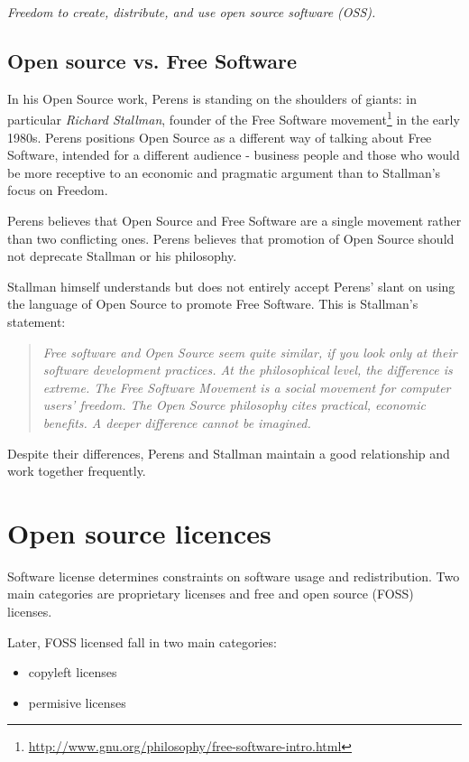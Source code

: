 \documentclass[times, utf8, seminar]{fit}
\begin{document}
\begin{center}
\emph{\large{Freedom to create, distribute, and use open source software (OSS).}}
\end{center}


\subsection{Open source vs. Free Software}

In his Open Source work, Perens is standing on the shoulders of giants: in particular \emph{Richard Stallman}, founder of the Free Software movement\footnote{\url{http://www.gnu.org/philosophy/free-software-intro.html}} in the early 1980s. Perens positions Open Source as a different way of talking about Free Software, intended for a different audience - business people and those who would be more receptive to an economic and pragmatic argument than to Stallman's focus on Freedom\citep{web:perens}.

Perens believes that Open Source and Free Software are a single movement rather than two conflicting ones. Perens believes that promotion of Open Source should not deprecate Stallman or his philosophy.

Stallman himself understands but does not entirely accept Perens' slant on using the language of Open Source to promote Free Software. This is Stallman's statement:

\begin{quotation}
\emph{Free software and Open Source seem quite similar, if you look only at their software development practices. At the philosophical level, the difference is extreme. The Free Software Movement is a social movement for computer users' freedom. The Open Source philosophy cites practical, economic benefits. A deeper difference cannot be imagined.}
\end{quotation}

Despite their differences, Perens and Stallman maintain a good relationship and work together frequently.
\section{Open source licences}

Software license determines constraints on software usage and redistribution. Two main categories are proprietary licenses and free and open source (FOSS) licenses.

Later, FOSS licensed fall in two main categories:
\begin{itemize}
  \item copyleft licenses
  \item permisive licenses 
\end{itemize} 
\end{document}
